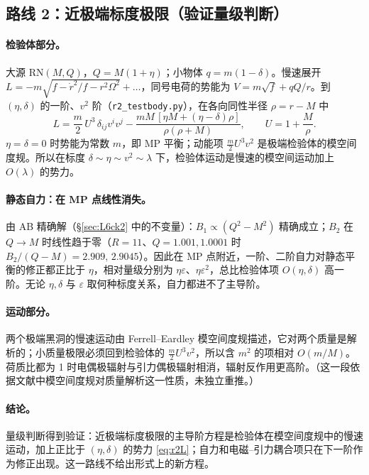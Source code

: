 \documentclass[11pt,a4paper]{ctexart}
\numberwithin{equation}{section}
\begin{document}
\subsection{路线 2：近极端标度极限（验证量级判断）}
\label{sec:L6route2}

\paragraph{检验体部分。}大源 RN$(M,Q)$，$Q=M(1+\eta)$；小物体 $q=m(1-\delta)$。慢速展开 $L=-m\sqrt{f-\dot r^2/f-r^2\Omega^2}+\dots$，同号电荷的势能为 $V=m\sqrt f+qQ/r$。到 $(\eta,\delta)$ 的一阶、$v^2$ 阶（\texttt{r2\_testbody.py}），在各向同性半径 $\rho=r-M$ 中
\begin{equation}
L=\frac m2\,U^3\,\delta_{ij}v^iv^j-\frac{mM\,[\eta M+(\eta-\delta)\rho]}{\rho(\rho+M)},\qquad U=1+\frac M\rho .
\label{eq:r2L}
\end{equation}
$\eta=\delta=0$ 时势能为常数 $m$，即 MP 平衡；动能项 $\tfrac m2U^3v^2$ 是极端检验体的模空间度规。所以在标度 $\delta\sim\eta\sim v^2\sim\lambda$ 下，检验体运动是慢速的模空间运动加上 $O(\lambda)$ 的势力。

\paragraph{静态自力：在 MP 点线性消失。}由 AB 精确解（\S\ref{sec:L6ck2} 中的不变量）：$B_1\propto(Q^2-M^2)$ 精确成立；$B_2$ 在 $Q\to M$ 时线性趋于零（$R=11$、$Q=1.001,1.0001$ 时 $B_2/(Q-M)=2.909,\,2.9045$）。因此在 MP 点附近，一阶、二阶自力对静态平衡的修正都正比于 $\eta$，相对量级分别为 $\eta\varepsilon$、$\eta\varepsilon^2$，总比检验体项 $O(\eta,\delta)$ 高一阶。无论 $\eta,\delta$ 与 $\varepsilon$ 取何种标度关系，自力都进不了主导阶。

\paragraph{运动部分。}两个极端黑洞的慢速运动由 Ferrell--Eardley 模空间度规描述，它对两个质量是解析的；小质量极限必须回到检验体的 $\tfrac m2U^3v^2$，所以含 $m^2$ 的项相对 $O(m/M)$。荷质比都为 1 时电偶极辐射与引力偶极辐射相消，辐射反作用更高阶。（这一段依据文献中模空间度规对质量解析这一性质，未独立重推。）

\paragraph{结论。}量级判断得到验证：近极端标度极限的主导阶方程是检验体在模空间度规中的慢速运动，加上正比于 $(\eta,\delta)$ 的势力 \eqref{eq:r2L}；自力和电磁--引力耦合项只在下一阶作为修正出现。这一路线不给出形式上的新方程。
\end{document}
